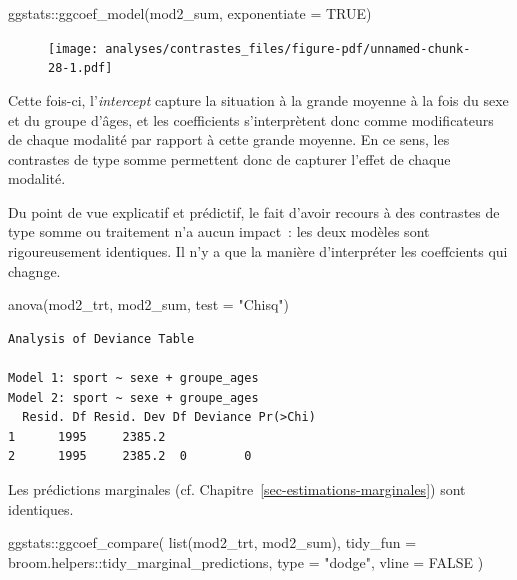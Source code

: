 \documentclass[
  letterpaper,
  DIV=11,
  numbers=noendperiod,
  oneside]{scrreprt}
\newenvironment{Shaded}{\begin{snugshade}}{\end{snugshade}}
\newcommand{\AttributeTok}[1]{\textcolor[rgb]{0.40,0.45,0.13}{#1}}
\newcommand{\ConstantTok}[1]{\textcolor[rgb]{0.56,0.35,0.01}{#1}}
\newcommand{\FunctionTok}[1]{\textcolor[rgb]{0.28,0.35,0.67}{#1}}
\newcommand{\NormalTok}[1]{\textcolor[rgb]{0.00,0.23,0.31}{#1}}
\newcommand{\SpecialCharTok}[1]{\textcolor[rgb]{0.37,0.37,0.37}{#1}}
\newcommand{\StringTok}[1]{\textcolor[rgb]{0.13,0.47,0.30}{#1}}
\begin{document}
\begin{Shaded}
\begin{Highlighting}[]
\NormalTok{ggstats}\SpecialCharTok{::}\FunctionTok{ggcoef\_model}\NormalTok{(mod2\_sum, }\AttributeTok{exponentiate =} \ConstantTok{TRUE}\NormalTok{)}
\end{Highlighting}
\end{Shaded}

\begin{figure}[H]

{\centering \texttt{[image: analyses/contrastes\_files/figure-pdf/unnamed-chunk-28-1.pdf]}

}

\end{figure}

Cette fois-ci, l'\emph{intercept} capture la situation à la grande
moyenne à la fois du sexe et du groupe d'âges, et les coefficients
s'interprètent donc comme modificateurs de chaque modalité par rapport à
cette grande moyenne. En ce sens, les contrastes de type somme
permettent donc de capturer l'effet de chaque modalité.

Du point de vue explicatif et prédictif, le fait d'avoir recours à des
contrastes de type somme ou traitement n'a aucun impact~: les deux
modèles sont rigoureusement identiques. Il n'y a que la manière
d'interpréter les coeffcients qui chagnge.

\begin{Shaded}
\begin{Highlighting}[]
\FunctionTok{anova}\NormalTok{(mod2\_trt, mod2\_sum, }\AttributeTok{test =} \StringTok{"Chisq"}\NormalTok{)}
\end{Highlighting}
\end{Shaded}

\begin{verbatim}
Analysis of Deviance Table

Model 1: sport ~ sexe + groupe_ages
Model 2: sport ~ sexe + groupe_ages
  Resid. Df Resid. Dev Df Deviance Pr(>Chi)
1      1995     2385.2                     
2      1995     2385.2  0        0         
\end{verbatim}

Les prédictions marginales (cf.
Chapitre~\ref{sec-estimations-marginales}) sont identiques.

\begin{Shaded}
\begin{Highlighting}[]
\NormalTok{ggstats}\SpecialCharTok{::}\FunctionTok{ggcoef\_compare}\NormalTok{(}
  \FunctionTok{list}\NormalTok{(mod2\_trt, mod2\_sum),}
  \AttributeTok{tidy\_fun =}\NormalTok{ broom.helpers}\SpecialCharTok{::}\NormalTok{tidy\_marginal\_predictions,}
  \AttributeTok{type =} \StringTok{"dodge"}\NormalTok{,}
  \AttributeTok{vline =} \ConstantTok{FALSE}
\NormalTok{)}
\end{Highlighting}
\end{Shaded}
\end{document}

